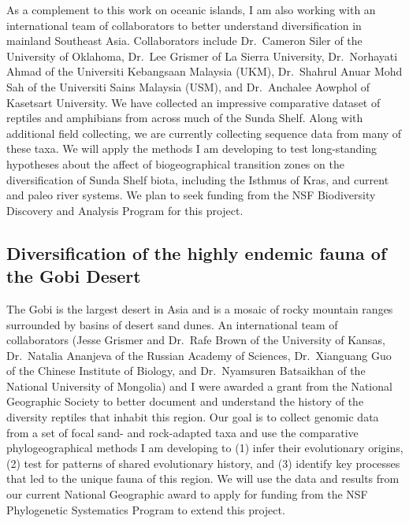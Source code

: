 As a complement to this work on oceanic islands, I am also working with an
international team of collaborators to better understand diversification in
mainland Southeast Asia.
Collaborators include
Dr.\ Cameron Siler of the University of Oklahoma,
Dr.\ Lee Grismer of La Sierra University,
Dr.\ Norhayati Ahmad of the Universiti
Kebangsaan Malaysia (UKM),
Dr.\ Shahrul Anuar Mohd Sah of the Universiti Sains Malaysia (USM),
and
Dr.\ Anchalee Aowphol of Kasetsart University.
We have collected an impressive comparative dataset of reptiles and amphibians
from across much of the Sunda Shelf.
Along with additional field collecting, we are currently collecting sequence
data from many of these taxa.
We will apply the methods I am developing to test long-standing hypotheses
about the affect of biogeographical transition zones on the diversification of
Sunda Shelf biota, including the Isthmus of Kras, and current and paleo river
systems.
We plan to seek funding from the NSF Biodiversity Discovery and Analysis
Program for this project.

\subsection*{Diversification of the highly endemic fauna of the Gobi Desert}
The Gobi is the largest desert in Asia and is a mosaic of rocky mountain ranges
surrounded by basins of desert sand dunes.
An international team of collaborators (Jesse Grismer and Dr.\ Rafe Brown of
the University of Kansas, Dr.\ Natalia Ananjeva of the Russian Academy of
Sciences, Dr.\ Xianguang Guo of the Chinese Institute of Biology, and Dr.\
Nyamsuren Batsaikhan of the National University of Mongolia) and I were awarded
a grant from the National Geographic Society to better document and understand
the history of the diversity reptiles that inhabit this region.
Our goal is to collect genomic data from a set of focal sand- and rock-adapted
taxa and use the comparative phylogeographical methods I am developing to
(1) infer their evolutionary origins,
(2) test for patterns of shared evolutionary history, and
(3) identify key processes that led to the unique fauna of this region.
We will use the data and results from our current National Geographic award to
apply for funding from the NSF Phylogenetic Systematics Program to extend this
project.

